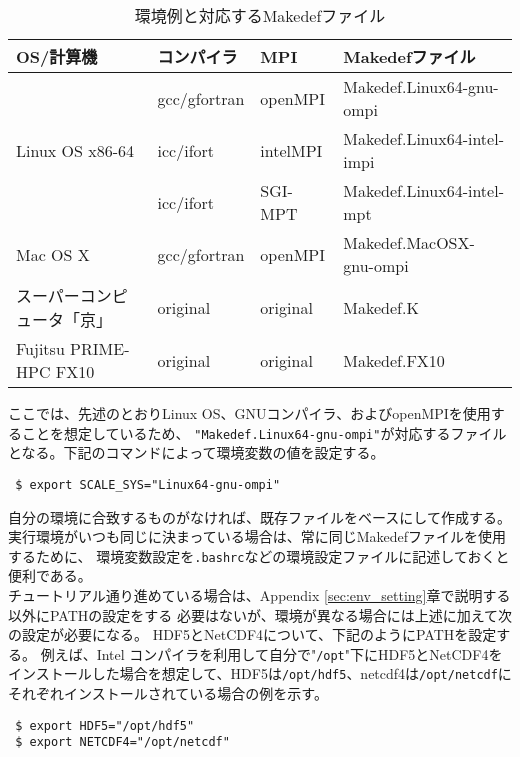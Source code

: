 \begin{table}[htb]
\begin{center}
\caption{環境例と対応するMakedefファイル}
\begin{tabularx}{150mm}{|l|l|X|l|} \hline
 \rowcolor[gray]{0.9} OS/計算機 & コンパイラ & MPI & Makedefファイル \\ \hline
              & gcc/gfortran & openMPI & Makedef.Linux64-gnu-ompi \\ \cline{2-4}
 Linux OS x86-64 & icc/ifort & intelMPI & Makedef.Linux64-intel-impi \\ \cline{2-4}
              & icc/ifort    & SGI-MPT & Makedef.Linux64-intel-mpt \\ \hline
 Mac OS X     & gcc/gfortran & openMPI & Makedef.MacOSX-gnu-ompi \\ \hline
 スーパーコンピュータ「京」 & original\footnotemark[1] & original\footnotemark[1] & Makedef.K \\ \hline
 Fujitsu PRIME-HPC FX10   & original\footnotemark[1] & original\footnotemark[1] & Makedef.FX10 \\ \hline
\end{tabularx}
\label{tab:makedef}
\end{center}
\end{table}

ここでは、先述のとおりLinux OS、GNUコンパイラ、およびopenMPIを使用することを想定しているため、
\verb|"Makedef.Linux64-gnu-ompi"|が対応するファイルとなる。下記のコマンドによって環境変数の値を設定する。
\begin{verbatim}
 $ export SCALE_SYS="Linux64-gnu-ompi"
\end{verbatim}
自分の環境に合致するものがなければ、既存ファイルをベースにして作成する。
実行環境がいつも同じに決まっている場合は、常に同じMakedefファイルを使用するために、
環境変数設定を\verb|.bashrc|などの環境設定ファイルに記述しておくと便利である。\\


チュートリアル通り進めている場合は、Appendix \ref{sec:env_setting}章で説明する以外にPATHの設定をする
必要はないが、環境が異なる場合には上述に加えて次の設定が必要になる。
HDF5とNetCDF4について、下記のようにPATHを設定する。
例えば、Intel コンパイラを利用して自分で"\verb|/opt|"下にHDF5とNetCDF4を
インストールした場合を想定して、HDF5は\verb"/opt/hdf5"、netcdf4は\verb|/opt/netcdf|に
それぞれインストールされている場合の例を示す。
\begin{verbatim}
 $ export HDF5="/opt/hdf5"
 $ export NETCDF4="/opt/netcdf"
\end{verbatim}

